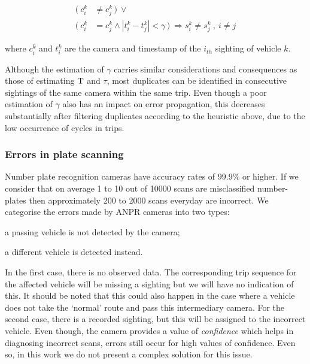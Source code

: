 \vspace{-0.5cm}
\begin{align} \label{e.sighting.different.2}
 (\ c^{k}_{i} &\ne c^{k}_{j} \, )\ \vee \\
 (\ c^{k}_{i} &= c^{k}_{j} \wedge |t^{k}_{i} - t^{k}_{j}| < \gamma \, )\ \Rightarrow s^{k}_{i} \ne s^{k}_{j}  \ , \ i \ne j \nonumber
\end{align}

where $c_i^k$ and $t_i^k$ are the camera and timestamp of the $i_{th}$ sighting of vehicle $k$.

 Although the estimation of $\gamma$ carries similar considerations and consequences as those of estimating $\mathrm{T}$ and $\tau$, most duplicates can be identified in consecutive sightings of the same camera within the same trip. Even though a poor estimation of $\gamma$ also has an impact on error propagation, this decreases substantially after filtering duplicates according to the heuristic above, due to the low occurrence of cycles in trips.

\subsubsection*{Errors in plate scanning}

Number plate recognition cameras have accuracy rates of 99.9\% or higher. If we consider that on average 1 to 10 out of 10000 scans are misclassified number-plates then approximately 200 to 2000 scans everyday are incorrect. We categorise the errors made by ANPR cameras into two types:
\begin{enumerate*}[label=(\roman*)]
  \item a passing vehicle is not detected by the camera;
  \item a different vehicle is detected instead.
\end{enumerate*}
In the first case, there is no observed data. The corresponding trip sequence for the affected vehicle will be missing a sighting but we will have no indication of this. It should be noted that this could also happen in the case where a vehicle does not take the `normal' route and pass this intermediary camera. For the second case, there is a recorded sighting, but this will be assigned to the incorrect vehicle. Even though, the camera provides a value of \emph{confidence} which helps in diagnosing incorrect scans, errors still occur for high values of confidence. Even so, in this work we do not present a complex solution for this issue.
